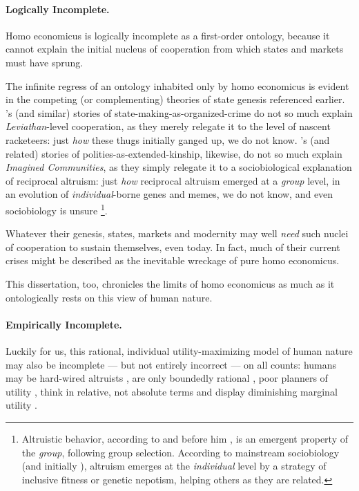 {\paragraph{Logically Incomplete.}
Homo economicus is logically incomplete as a first-order ontology, because it cannot explain the initial nucleus of cooperation from which states and markets must have sprung.

The infinite regress of an ontology inhabited only by homo economicus is evident in the competing (or complementing) theories of state genesis referenced earlier.
\citeauthor{Tilly-1985-aa}'s (and similar) stories of state-making-as-organized-crime do not so much explain \emph{Leviathan}-level cooperation, as they merely relegate it to the level of nascent racketeers: just \emph{how} these thugs initially ganged up, we do not know.
\citeauthor{Van-den-Berghe-1981-aa}'s (and related) stories of polities-as-extended-kinship, likewise, do not so much explain \emph{Imagined Communities}, as they simply relegate it to a sociobiological explanation of reciprocal altruism: just \emph{how} reciprocal altruism emerged at a \emph{group} level, in an evolution of \emph{individual}-borne genes and memes, we do not know, and even sociobiology is unsure
\footnote{
	Altruistic behavior, according to \cite{Wilson2012} and before him \cite{Darwin1859}, is an emergent property of the \emph{group}, following group selection.
	According to mainstream sociobiology (and initially \citealt{Wilson1975}), altruism emerges at the \emph{individual} level by a strategy of inclusive fitness or genetic nepotism, helping others as they are related.
}.

Whatever their genesis, states, markets and modernity may well \emph{need} such nuclei of cooperation to sustain themselves, even today.
In fact, much of their current crises might be described as the inevitable wreckage of pure homo economicus.

This dissertation, too, chronicles the limits of homo economicus as much as it ontologically rests on this view of human nature.

\paragraph{Empirically Incomplete.}
Luckily for us, this rational, individual utility-maximizing model of human nature may also be incomplete --- but not entirely incorrect --- on all counts: humans may be hard-wired altruists \citep[for example,][]{Zak2004}, are only boundedly rational \citep{Simon-1999-aa,Kahneman2011}, poor planners of utility \citep[summarized in][]{Gilbert2006}, think in relative, not absolute terms \citep{Frank2005} and display diminishing marginal utility \citep{Ng-1997-aa,Veenhoven-2000-aa,Nickell2008}. %

}
